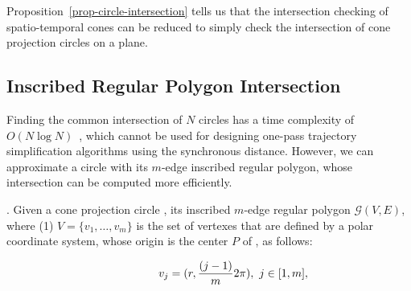 

Proposition~\ref{prop-circle-intersection} tells us that the intersection checking of  spatio-temporal cones can be reduced to simply check the intersection of cone projection circles on a plane.


\subsection{Inscribed Regular Polygon Intersection}
\label{subsec-RPI}

Finding the common intersection of $N$ circles has a time complexity of ${O(N\log N)}$~\cite{Shamos:Circle}, which cannot be used 
for designing one-pass trajectory simplification algorithms using the synchronous distance.
%
However, we can approximate a circle with its $m$-edge inscribed regular polygon, whose intersection can be computed more efficiently.




.
Given a cone projection circle , its inscribed $m$-edge regular polygon $\mathcal{G}(V, E)$,
where (1) $V=\{v_1, \ldots, v_{m}\}$ is the set of vertexes that are defined by a polar coordinate system, whose origin is the center $P$ of \pcircle{}, as follows:


\vspace{-1ex}
\begin{equation*}
\label{equ-regular-polygon}
    \begin{aligned}
        \hspace{10ex}  v_j = (r, \frac{(j-1)}{m}2\pi), ~j \in [1, m], \\
    \end{aligned}
\end{equation*}
\vspace{-1ex}

